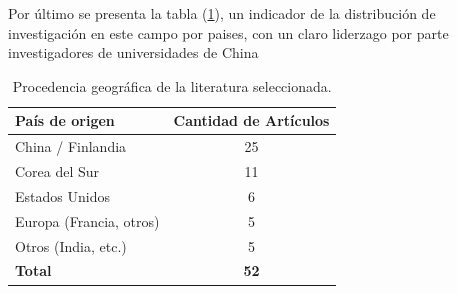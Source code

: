 Por último se presenta la tabla (\ref{tab:distribucion_paises}), un indicador de la distribución de investigación en este campo por paises, con un claro liderzago
por parte investigadores de universidades de China

\begin{table}[htbp]
    \centering
    \caption{Procedencia geográfica de la literatura seleccionada.}
    \label{tab:distribucion_paises}
    \begin{tabular}{|l|c|}
        \hline
        \textbf{País de origen} & \textbf{Cantidad de Artículos} \\ \hline
        China / Finlandia       & 25                             \\ \hline
        Corea del Sur           & 11                             \\ \hline
        Estados Unidos          & 6                              \\ \hline
        Europa (Francia, otros) & 5                              \\ \hline
        Otros (India, etc.)     & 5                              \\ \hline
        \textbf{Total}          & \textbf{52}                    \\ \hline
    \end{tabular}
\end{table}

\newpage



